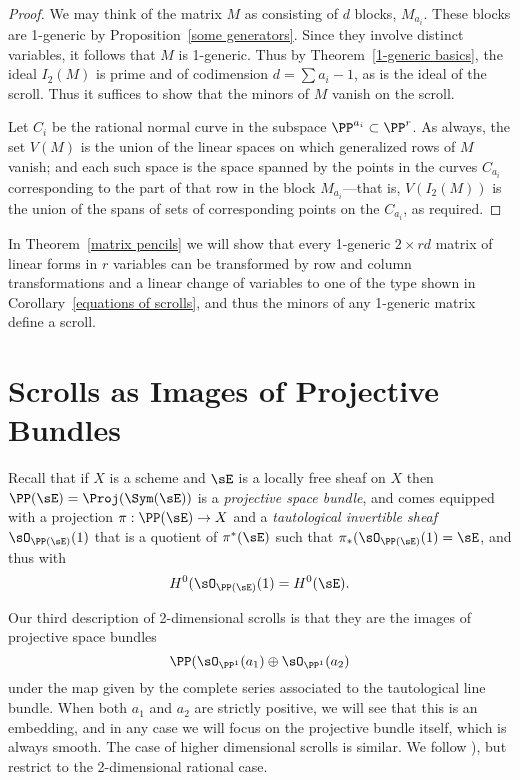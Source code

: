 \begin{proof} We may think of the matrix $M$ as consisting of $d$ blocks, $M_{a_{i}}$. These blocks are 1-generic by Proposition~\ref{some generators}. Since they involve distinct variables, it follows that $M$ is 1-generic. Thus by
Theorem~\ref{1-generic basics}, the ideal $I_{2}(M)$ is prime and of codimension $d = \sum a_{i}-1$, as is the ideal of the scroll. Thus it suffices to show that the minors of $M$ vanish on the scroll.

Let $C_{i}$ be the rational normal curve in the subspace $\PP^{a_{i}}\subset\PP^{r}$.
As always, the set $V(M)$ is the union of the linear spaces on which generalized rows of $M$ vanish; and each such space is the space spanned by the points in the curves $C_{a_{i}}$ corresponding to the part of that row in the block $M_{a_{i}}$---that is, $V(I_{2}(M))$ is the union of the spans of sets of corresponding points on the $C_{a_{i}}$, as required.
\end{proof}

 In Theorem~\ref{matrix pencils} we will show that every
 1-generic $2 \times rd$ matrix of linear forms in $r$ variables can be transformed by row and column transformations and a linear change
 of variables to one of the type shown in
Corollary~\ref{equations of scrolls}, and thus the minors of any 1-generic matrix define a scroll.

 



\section{Scrolls as Images of Projective Bundles}\label{inscrutable name}

Recall that if $X$ is a scheme and $\sE$ is a locally free sheaf on $X$ then $\PP(\sE) = \Proj(\Sym(\sE))$ is a \emph{projective space bundle}, and comes equipped with a projection $\pi: \PP(\sE) \to X$ and a \emph{tautological invertible sheaf} $\sO_{\PP(\sE)}(1)$ that is a quotient of $\pi^{*}(\sE)$ such that $\pi_{*}(\sO_{\PP(\sE)}(1) = \sE$, and thus with
$$
H^{0}(\sO_{\PP(\sE)}(1) = H^{0}(\sE).
$$

Our third description of 2-dimensional scrolls is that they are the images of projective space bundles 
$$
\PP(\sO_{\PP^{1}}(a_{1})\oplus \sO_{\PP^{1}}(a_{2})
$$ 
under the map given by the complete series associated to the tautological line bundle. When both $a_{1}$ and $a_{2}$ are strictly positive, we will see that this is an embedding, and in any case we will focus on the projective bundle itself, which is always smooth. The case of higher dimensional scrolls is similar. We follow  \cite[Chapter V]{Hartshorne1977}), but restrict
to the 2-dimensional rational case. 


